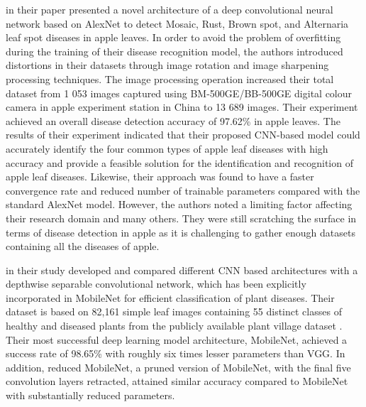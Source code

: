 \cite{liu2018identification} in their paper presented a novel architecture of a deep convolutional neural network based on AlexNet to detect Mosaic, Rust, Brown spot, and Alternaria leaf spot diseases in apple leaves. In order to avoid the problem of overfitting during the training of their disease recognition model, the authors introduced distortions in their datasets through image rotation and image sharpening processing techniques. The image processing operation increased their total dataset from 1 053 images captured using BM-500GE/BB-500GE digital colour camera in apple experiment station in China to 13 689 images. Their experiment achieved an overall disease detection accuracy of 97.62\% in apple leaves. The results of their experiment indicated that their proposed CNN-based model could accurately identify the four common types of apple leaf diseases with high accuracy and provide a feasible solution for the identification and recognition of apple leaf diseases. Likewise, their approach was found to have a faster convergence rate and reduced number of trainable parameters compared with the standard AlexNet model. However, the authors noted a limiting factor affecting their research domain and many others. They were still scratching the surface in terms of disease detection in apple as it is challenging to gather enough datasets containing all the diseases of apple. 


\cite{kamal2019depthwise} in their study developed and compared different CNN based architectures with a depthwise separable convolutional network, which has been explicitly incorporated in MobileNet for efficient classification of plant diseases. Their dataset is based on 82,161 simple leaf images containing 55 distinct classes of healthy and diseased plants from the publicly available plant village dataset \cite{hughes2015open}. Their most successful deep learning model architecture, MobileNet, achieved a success rate of 98.65\% with roughly six times lesser parameters than VGG. In addition, reduced MobileNet, a pruned version of MobileNet, with the final five convolution layers retracted, attained similar accuracy compared to MobileNet with substantially reduced parameters.














